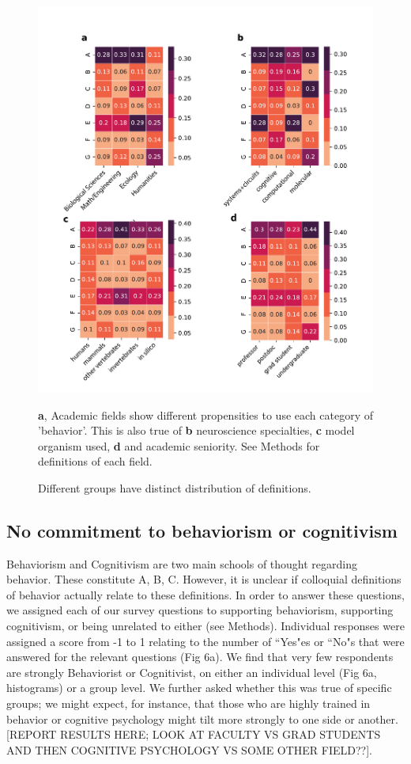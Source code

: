 \documentclass[a4paper, 11pt]{article}
\begin{document}
\begin{figure}
\centerline{\includegraphics[width=\textwidth]{fig5.pdf}}
\caption{Different groups have distinct distribution of definitions.} \textbf{a}, Academic fields show different propensities to use each category of 'behavior'. This is also true of \textbf{b} neuroscience specialties, \textbf{c} model organism used, \textbf{d} and academic seniority. See Methods for definitions of each field.
\end{figure}

\subsection*{No commitment to behaviorism or cognitivism}
Behaviorism and Cognitivism are two main schools of thought regarding behavior. These constitute A, B, C. However, it is unclear if colloquial definitions of behavior actually relate to these definitions. In order to answer these questions, we assigned each of our survey questions to supporting behaviorism, supporting cognitivism, or being unrelated to either (see Methods). Individual responses were assigned a score from -1 to 1 relating to the number of ``Yes"es or ``No"s that were answered for the relevant questions (Fig 6a). We find that very few respondents are strongly Behaviorist or Cognitivist, on either an individual level (Fig 6a, histograms) or a group level. We further asked whether this was true of specific groups; we might expect, for instance, that those who are highly trained in behavior or cognitive psychology might tilt more strongly to one side or another. [REPORT RESULTS HERE; LOOK AT FACULTY VS GRAD STUDENTS AND THEN COGNITIVE PSYCHOLOGY VS SOME OTHER FIELD??].
\end{document}
